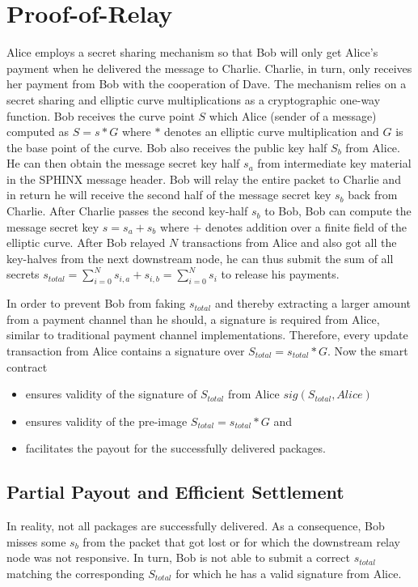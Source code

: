 \section{Proof-of-Relay} \label{ProofOfRelay}

Alice employs a secret sharing mechanism so that Bob will only get Alice's payment when he delivered the message to Charlie. Charlie, in turn, only receives her payment from Bob with the cooperation of Dave. The mechanism relies on a secret sharing and elliptic curve multiplications as a cryptographic one-way function. Bob receives the curve point $S$ which Alice (sender of a message) computed as $S = s * G$ where $*$ denotes an elliptic curve multiplication and $G$ is the base point of the curve. Bob also receives the public key half $S_b$ from Alice. He can then obtain the message secret key half $s_a$ from intermediate key material in the SPHINX message header. Bob will relay the entire packet to Charlie and in return he will receive the second half of the message secret key $s_b$ back from Charlie. After Charlie passes the second key-half $s_b$ to Bob, Bob can compute the message secret key $s = s_a + s_b$ where $+$ denotes addition over a finite field of the elliptic curve. After Bob relayed $N$ transactions from Alice and also got all the key-halves from the next downstream node, he can thus submit the sum of all secrets $s_{total} = \sum_{i=0}^{N} s_{i,a} + s_{i,b} = \sum_{i=0}^{N} s_i$ to release his payments.

In order to prevent Bob from faking $s_{total}$ and thereby extracting a larger amount from a payment channel than he should, a signature is required from Alice, similar to traditional payment channel implementations. Therefore, every update transaction from Alice contains a signature over $S_{total} = s_{total} * G$. Now the smart contract

\begin{itemize}
    \item ensures validity of the signature of $S_{total}$ from Alice $sig(S_{total}, Alice)$
    \item ensures validity of the pre-image $S_{total} = s_{total} * G$ and
    \item facilitates the payout for the successfully delivered packages.
\end{itemize}

\subsection{Partial Payout and Efficient Settlement}
\noindent In reality, not all packages are successfully delivered. As a consequence, Bob misses some $s_b$ from the packet that got lost or for which the downstream relay node was not responsive. In turn, Bob is not able to submit a correct $s_{total}$ matching the corresponding $S_{total}$ for which he has a valid signature from Alice.

